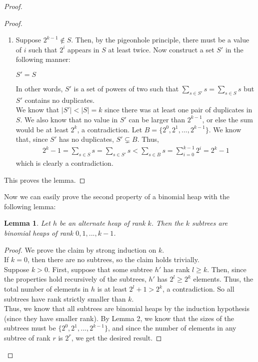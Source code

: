 \documentclass{article}
\newtheorem{lemma}[theorem]{Lemma}
\begin{document}
\begin{proof}
\begin{proof}
\begin{enumerate}
\item
Suppose $2^{k-1} \notin S$. Then, by the pigeonhole principle, there must be a value of $i$ such that $2^i$ appears in $S$ at least twice. Now construct a set $S'$ in the following manner:
\\\begin{algorithm}[H]
$S' = S$\;
\end{algorithm}
In other words, $S'$ is a set of powers of two such that $\sum_{s\in S'} s = \sum_{s\in S} s$ but $S'$ contains no duplicates.
\\We know that $|S'| < |S| = k$ since there was at least one pair of duplicates in $S$. We also know that no value in $S'$ can be larger than $2^{k-1}$, or else the sum would be at least $2^k$, a contradiction. Let $B = \lbrace 2^0, 2^1, ..., 2^{k-1}\rbrace$. We know that, since $S'$ has no duplicates, $S' \subsetneq B$. Thus, 
\begin{align*}
2^k-1 = \sum_{s\in S} s = \sum_{s\in S'} s < \sum_{s\in B} s = \sum_{i=0}^{k-1} 2^i = 2^k-1
\end{align*}
which is clearly a contradiction.
\end{enumerate}
This proves the lemma.
\end{proof}
Now we can easily prove the second property of a binomial heap with the following lemma: 
\begin{lemma}
Let $h$ be an alternate heap of rank $k$. Then the $k$ subtrees are binomial heaps of rank $0, 1, ..., k-1$.
\end{lemma}
\begin{proof}
We prove the claim by strong induction on $k$.
\\If $k=0$, then there are no subtrees, so the claim holds trivially.
\\Suppose $k>0$. First, suppose that some subtree $h'$ has rank $l \geq k$. Then, since the properties hold recursively of the subtrees, $h'$ has $2^l \geq 2^k$ elements. Thus, the total number of elements in $h$ is at least $2^l + 1 > 2^k$, a contradiction. So all subtrees have rank strictly smaller than $k$.
\\Thus, we know that all subtrees are binomial heaps by the induction hypothesis (since they have smaller rank). By Lemma 2, we know that the sizes of the subtrees must be $\lbrace 2^0, 2^1, ..., 2^{k-1}\rbrace$, and since the number of elements in any subtree of rank $r$ is $2^r$, we get the desired result.

\end{proof}
\end{proof}
\end{document}
